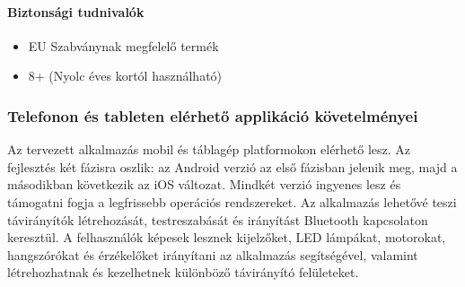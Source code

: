 \documentclass{article}
\begin{document}
\paragraph{Biztonsági tudnivalók}
\begin{itemize}
    \item EU Szabványnak megfelelő termék
    \item 8+ (Nyolc éves kortól használható)
\end{itemize}


\subsubsection{Telefonon és tableten elérhető applikáció követelményei}

Az tervezett alkalmazás mobil és táblagép platformokon elérhető lesz. Az fejlesztés két fázisra oszlik: az Android verzió az első fázisban jelenik meg, majd a másodikban következik az iOS változat. Mindkét verzió ingyenes lesz és támogatni fogja a legfrissebb operációs rendszereket. Az alkalmazás lehetővé teszi távirányítók létrehozását, testreszabását és irányítást Bluetooth kapcsolaton keresztül. A felhasználók képesek lesznek kijelzőket, LED lámpákat, motorokat, hangszórókat és érzékelőket irányítani az alkalmazás segítségével, valamint létrehozhatnak és kezelhetnek különböző távirányító felületeket.
\end{document}
